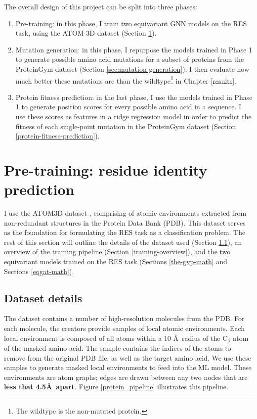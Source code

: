 The overall design of this project can be split into three phases:

\begin{enumerate}
    \item Pre-training: in this phase, I train two equivariant GNN models on the RES task, using the ATOM 3D dataset \cite{atom-3d} (Section \ref{phase1-res-task}).
    \item Mutation generation: in this phase, I repurpose the models trained in Phase 1 to generate possible amino acid mutations for a subset of proteins from the ProteinGym dataset \cite{tranception} (Section \ref{sec:mutation-generation}); I then evaluate how much better these mutations are than the wildtype\footnote{The wildtype is the non-mutated protein.} in Chapter \ref{results}.
    \item Protein fitness prediction: in the last phase, I use the models trained in Phase 1 to generate position scores for every possible amino acid in a sequence. I use these scores as features in a ridge regression model in order to predict the fitness of each single-point mutation in the ProteinGym dataset \cite{tranception} (Section \ref{protein-fitness-prediction}).
\end{enumerate}

\section{Pre-training: residue identity prediction}
\label{phase1-res-task}

I use the ATOM3D dataset \cite{atom-3d}, comprising of atomic environments extracted from non-redundant structures in the Protein Data Bank (PDB). This dataset serves as the foundation for formulating the RES task as a classification problem. The rest of this section will outline the details of the dataset used (Section \ref{res-dataset}), an overview of the training pipeline (Section \ref{training-overview}), and the two equivariant models trained on the RES task (Sections \ref{the-gvp-math} and Sections \ref{eqgat-math}). 

\subsection{Dataset details}
\label{res-dataset}
The dataset contains a number of high-resolution molecules from the PDB. 
For each molecule, the creators provide samples of local atomic environments. 
Each local environment is composed of all atoms within a 10 \AA ~radius of the $\text{C}_{\beta}$ atom of the masked amino acid.
The sample contains the indices of the atoms to remove from the original PDB file, as well as the target amino acid.
We use these samples to generate masked local environments to feed into the ML model. These environments are atom graphs; edges are drawn between any two nodes that are \textbf{less that 4.5\AA ~apart}. Figure \ref{protein_pipeline} illustrates this pipeline. 


